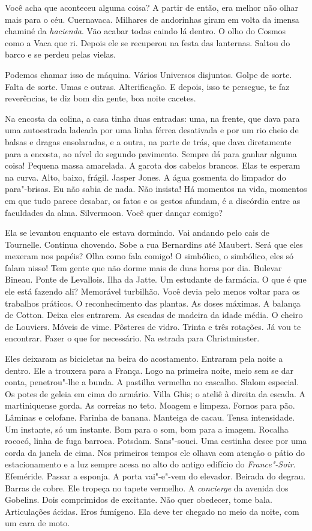 Você acha que aconteceu alguma coisa? A partir de então, era melhor não
olhar mais para o céu. Cuernavaca. Milhares de andorinhas giram em volta
da imensa chaminé da \emph{hacienda}. Vão acabar todas caindo lá dentro.
O olho do Cosmos como a Vaca que ri. Depois ele se recuperou na festa
das lanternas. Saltou do barco e se perdeu pelas vielas.

Podemos chamar isso de máquina. Vários Universos disjuntos. Golpe de
sorte. Falta de sorte. Umas e outras. Alterificação. E depois, isso te
persegue, te faz reverências, te diz bom dia gente, boa noite cacetes.

Na encosta da colina, a casa tinha duas entradas: uma, na frente, que
dava para uma autoestrada ladeada por uma linha férrea desativada e por
um rio cheio de balsas e dragas ensolaradas, e a outra, na parte de
trás, que dava diretamente para a encosta, ao nível do segundo
pavimento. Sempre dá para ganhar alguma coisa! Pequena massa amarelada.
A garota dos cabelos brancos. Elas te esperam na curva. Alto, baixo,
frágil. Jasper Jones. A água gosmenta do limpador do para"-brisas. Eu não
sabia de nada. Não insista! Há momentos na vida, momentos em que tudo
parece desabar, os fatos e os gestos afundam, é a discórdia entre as
faculdades da alma. Silvermoon. Você quer dançar comigo?

Ela se levantou enquanto ele estava dormindo. Vai andando pelo cais de
Tournelle. Continua chovendo. Sobe a rua Bernardins até Maubert. Será
que eles mexeram nos papéis? Olha como fala comigo! O simbólico, o
simbólico, eles só falam nisso! Tem gente que não dorme mais de duas
horas por dia. Bulevar Bineau. Ponte de Levallois. Ilha da Jatte. Um
estudante de farmácia. O que é que ele está fazendo ali? Memorável
turbilhão. Você devia pelo menos voltar para os trabalhos práticos. O
reconhecimento das plantas. As doses máximas. A balança de Cotton. Deixa
eles entrarem. As escadas de madeira da idade média. O cheiro de
Louviers. Móveis de vime. Pôsteres de vidro. Trinta e três rotações. Já
vou te encontrar. Fazer o que for necessário. Na estrada para
Christminster.

Eles deixaram as bicicletas na beira do acostamento. Entraram pela noite
a dentro. Ele a trouxera para a França. Logo na primeira noite, meio sem
se dar conta, penetrou"-lhe a bunda. A pastilha vermelha no cascalho.
Slalom especial. Os potes de geleia em cima do armário. Villa Ghis; o
ateliê à direita da escada. A martiniquense gorda. As correias no teto.
Moagem e limpeza. Fornos para pão. Lâminas e celofane. Farinha de
banana. Manteiga de cacau. Tensa intensidade. Um instante, só um
instante. Bom para o som, bom para a imagem. Rocalha rococó, linha de
fuga barroca. Potsdam. Sans"-souci. Uma cestinha desce por uma corda da
janela de cima. Nos primeiros tempos ele olhava com atenção o pátio do
estacionamento e a luz sempre acesa no alto do antigo edifício do
\emph{France"-Soir}. Efeméride. Passar a esponja. A porta vai"-e"-vem do
elevador. Beirada do degrau. Barras de cobre. Ele tropeça no tapete
vermelho. A \emph{concierge} da avenida dos Gobelins. Dois comprimidos
de excitante. Não quer obedecer, tome bala. Articulações ácidas. Eros
fumígeno. Ela deve ter chegado no meio da noite, com um cara de moto.

